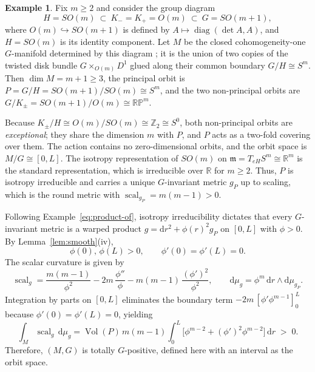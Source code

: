 \documentclass[12pt,a4paper]{amsart}
\theoremstyle{plain}
\theoremstyle{definition}
\newtheorem{example}[theorem]{Example}
\theoremstyle{remark}
\newcommand{\ga}{\mathit{g}} %
\begin{document}
\begin{example}\label{ex:Bohm}
Fix $m \ge 2$ and consider the group diagram
$$H = SO(m)\ \subset\ K_- = K_+ = O(m)\ \subset\ G = SO(m+1),$$
where $O(m)\hookrightarrow SO(m+1)$ is defined by $A \mapsto \operatorname{diag}(\det A, A)$, and $H=SO(m)$ is its identity component. Let $M$ be the closed cohomogeneity-one $G$-manifold determined by this diagram \cites{Mostert, alexandrino2015lie}; it is the union of two copies of the twisted disk bundle $G \times_{O(m)} D^1$ glued along their common boundary $G/H \cong S^m$. Then $\dim M = m+1 \ge 3$, the principal orbit is $P = G/H = SO(m+1)/SO(m) \cong S^m$, and the two non-principal orbits are $G/K_\pm = SO(m+1)/O(m) \cong \mathbb{RP}^m$.

Because $K_\pm/H \cong O(m)/SO(m) \cong \mathbb{Z}_2 \cong S^0$, both non-principal orbits are \emph{exceptional}; they share the dimension $m$ with $P$, and $P$ acts as a two-fold covering over them. The action contains no zero-dimensional orbits, and the orbit space is $M/G \cong [0,L]$. The isotropy representation of $SO(m)$ on $\mathfrak{m} = T_{eH}S^m \cong \mathbb{R}^m$ is the standard representation, which is irreducible over $\mathbb{R}$ for $m \ge 2$. Thus, $P$ is isotropy irreducible and carries a unique $G$-invariant metric $\ga_P$ up to scaling, which is the round metric with $\operatorname{scal}_{\ga_P} = m(m-1) > 0$.

Following Example~\ref{eq:product-of}, isotropy irreducibility dictates that every $G$-invariant metric is a warped product $\ga = \mathrm{d}r^2 + \phi(r)^2 \ga_P$ on $[0,L]$ with $\phi > 0$. By Lemma~\ref{lem:smooth}(iv),
$$\phi(0),\,\phi(L) > 0, \qquad \phi'(0) = \phi'(L) = 0.$$
The scalar curvature is given by
$$\operatorname{scal}_{\ga} = \frac{m(m-1)}{\phi^2} - 2m\,\frac{\phi''}{\phi} - m(m-1)\,\frac{(\phi')^2}{\phi^2}, \qquad \mathrm{d}\mu_{\ga} = \phi^{m}\,\mathrm{d}r \wedge \mathrm{d}\mu_{\ga_P}.$$
Integration by parts on $[0,L]$ eliminates the boundary term $-2m\,[\phi'\phi^{m-1}]_0^L$ because $\phi'(0)=\phi'(L)=0$, yielding
$$\int_M \operatorname{scal}_{\ga}\,\mathrm{d}\mu_{\ga} = \operatorname{Vol}(P)\,m(m-1)\int_0^L \bigl[\phi^{m-2} + (\phi')^2\phi^{m-2}\bigr]\,\mathrm{d}r \; > \; 0.$$
Therefore, $(M, G)$ is totally $G$-positive, defined here with an interval as the orbit space.
\end{example}
\end{document}
